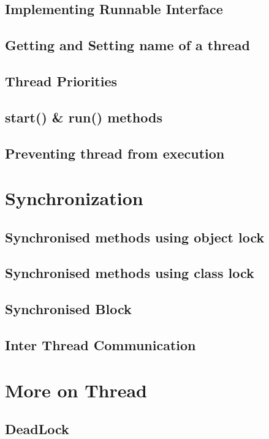 \documentclass[14pt,fleqn]{extbook} %
\begin{document}
\subsection{Implementing Runnable Interface}

\subsection{Getting and Setting name of a thread}

\subsection{Thread Priorities}

\subsection{start() \& run() methods}

\subsection{Preventing thread from execution}

\section{Synchronization}

\subsection{Synchronised methods using object lock}

\subsection{Synchronised methods using class lock}

\subsection{Synchronised Block}

\subsection{Inter Thread Communication}

\section{More on Thread}
\subsection{DeadLock}

\end{document}
